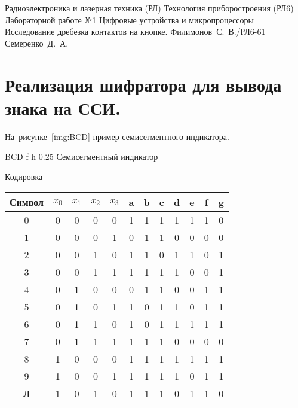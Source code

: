\documentclass{bmstu}
\begin{document}
	\makereporttitle
	{Радиоэлектроника и лазерная техника (РЛ)} %
	{Технология приборостроения (РЛ6)} %
	{Лабораторной работе №1} %
	{Цифровые устройства и микропроцессоры} %
	{Исследование дребезка контактов на кнопке.} %
	{} %
	{Филимонов~С.~В./РЛ6-61} %
	{Семеренко~Д.~А.} %
	
	\tableofcontents

	\chapter{Реализация шифратора для вывода знака на ССИ.}
	На~рисунке~\ref{img:BCD} пример семисегментного индикатора.
	
	{BCD} %
	{f} %
	{h} %
	{0.25\textwidth} %
	{Семисегментный индикатор} %
	
	Кодировка

	\begin{center}
		\begin{tabular}{ |c||c|c|c|c||c|c|c|c|c|c|c| } 
			\hline
		     Символ & $x_0$ & $x_1$ & $x_2$ & $x_3$ &  a & b & c & d & e & f & g \\
		    \hline
			 0 & 0 & 0 & 0 & 0 & 1 & 1 & 1 & 1 & 1 & 1 & 0 \\ 
			 1 & 0 & 0 & 0 & 1 & 0 & 1 & 1 & 0 & 0 & 0 & 0 \\
			 2 & 0 & 0 & 1 & 0 & 1 & 1 & 0 & 1 & 1 & 0 & 1 \\
			 3 & 0 & 0 & 1 & 1 & 1 & 1 & 1 & 1 & 0 & 0 & 1 \\
			 4 & 0 & 1 & 0 & 0 & 0 & 1 & 1 & 0 & 0 & 1 & 1 \\
			 5 & 0 & 1 & 0 & 1 & 1 & 0 & 1 & 1 & 0 & 1 & 1 \\
			 6 & 0 & 1 & 1 & 0 & 1 & 0 & 1 & 1 & 1 & 1 & 1 \\
			 7 & 0 & 1 & 1 & 1 & 1 & 1 & 1 & 0 & 0 & 0 & 0 \\
			 8 & 1 & 0 & 0 & 0 & 1 & 1 & 1 & 1 & 1 & 1 & 1 \\
			 9 & 1 & 0 & 0 & 1 & 1 & 1 & 1 & 1 & 0 & 1 & 1 \\
			 Л & 1 & 0 & 1 & 0 & 1 & 1 & 1 & 0 & 1 & 1 & 0 \\
			\hline
		\end{tabular}
	\end{center}
	
\end{document}
